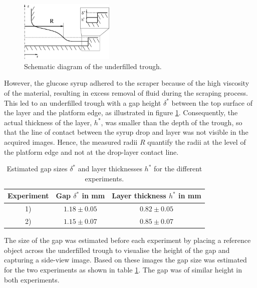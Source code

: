 \documentclass[aip,graphicx]{revtex4-1}
\begin{document}
\begin{figure}[!ht]
\centering
\includegraphics[width=0.4\textwidth]{figures/axisym_drop_nozzle_gap.eps}
\caption{Schematic diagram of the underfilled trough.}
\label{fig:axisym_drop_nozzle_gap}
\end{figure}
 
However, the glucose syrup adhered to the scraper because of the high viscosity of the material, resulting in excess removal of fluid during the scraping process. 
This led to an underfilled trough with a gap height $\delta^*$ between the top surface of the layer and the platform edge, as illustrated in figure \ref{fig:axisym_drop_nozzle_gap}.
Consequently, the actual thickness of the layer, $h^*$, was smaller than the depth of the trough, so that the line of contact between the syrup drop and layer was not visible in the acquired images. 
Hence, the measured radii $R$ quantify the radii at the level of the platform edge and not at the drop-layer contact line.
 
{\renewcommand{\arraystretch}{1.2}
 \begin{table}[!ht]
 \begin{center}
 \begin{tabular}{c | c | c}
  Experiment & Gap $\delta^*$ in mm & Layer thickness $h^*$ in mm \\ 
   \hline
   1) & $1.18 \pm 0.05$ & $0.82 \pm 0.05$ \\
   2) & $1.15 \pm 0.07$ & $0.85 \pm 0.07$
 \end{tabular}
 \caption{Estimated gap sizes $\delta^*$ and layer thicknesses $h^*$ for the different experiments.}
 \label{tab:gap_sizes}
 \end{center}
 \end{table}}
 
The size of the gap was estimated before each experiment by placing a reference object across the underfilled trough to visualise the height of the gap and capturing a side-view image.
Based on these images the gap size was estimated for the two experiments as shown in table \ref{tab:gap_sizes}.
The gap was of similar height in both experiments.
\end{document}
